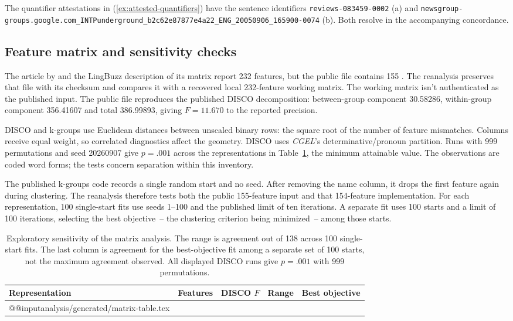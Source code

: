 \documentclass[12pt]{article}
\makeatletter
\newcommand{\tablebody}[1]{\csname @@input\endcsname #1 }
\makeatother
\begin{document}
The quantifier attestations in (\ref{ex:attested-quantifiers}) have the sentence identifiers \nolinkurl{reviews-083459-0002} (a) and \nolinkurl{newsgroup-groups.google.com_INTPunderground_b2c62e87877e4a22_ENG_20050906_165900-0074} (b). Both resolve in the accompanying concordance.

\subsection{Feature matrix and sensitivity checks}

The article by \textcite{reynolds2021} and the LingBuzz description of its matrix report 232 features, but the public file contains 155 \citep{reynolds2021matrixpublic}. The reanalysis preserves that file with its checksum and compares it with a recovered local 232-feature working matrix. The working matrix isn't authenticated as the published input. The public file reproduces the published DISCO decomposition: between-group component 30.58286, within-group component 356.41607 and total 386.99893, giving $F=11.670$ to the reported precision.

DISCO and k-groups use Euclidean distances between unscaled binary rows: the square root of the number of feature mismatches. Columns receive equal weight, so correlated diagnostics affect the geometry. DISCO uses \textit{CGEL}'s determinative/pronoun partition. Runs with 999 permutations and seed 20260907 give \mbox{$p=.001$} across the representations in Table~\ref{tab:matrix}, the minimum attainable value. The observations are coded word forms; the tests concern separation within this inventory.

The published k-groups code records a single random start and no seed. After removing the name column, it drops the first feature again during clustering. The reanalysis therefore tests both the public 155-feature input and that 154-feature implementation. For each representation, 100 single-start fits use seeds 1--100 and the published limit of ten iterations. A separate fit uses 100 starts and a limit of 100 iterations, selecting the best objective~-- the clustering criterion being minimized~-- among those starts.

\begin{table}[htbp]
\centering\small
\caption{Exploratory sensitivity of the matrix analysis. The range is agreement out of 138 across 100 single-start fits. The last column is agreement for the best-objective fit among a separate set of 100 starts, not the maximum agreement observed. All displayed DISCO runs give \mbox{$p=.001$} with 999 permutations.}\label{tab:matrix}
\begin{tabular}{>{\raggedright\arraybackslash}p{5.1cm}rrrr}
\toprule
Representation & Features & DISCO $F$ & Range & Best objective \\
\midrule
\tablebody{analysis/generated/matrix-table.tex}
\bottomrule
\end{tabular}
\end{table}
\end{document}
